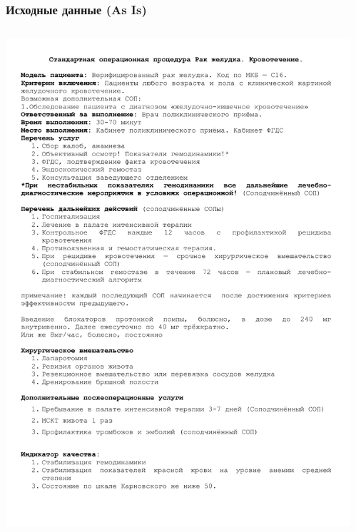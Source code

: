 \documentclass[10pt]{beamer}
\begin{document}
\begin{frame}
  \frametitle{Исходные данные (As Is)}
  \begin{columns}[t]
    \begin{column}{0.5\textwidth}
    \includegraphics[width=1\linewidth]{qms-pics/sop-ex-1.pdf}
    \end{column}
    \begin{column}{0.5\textwidth}

\end{column}
\end{columns}
\end{frame}
\end{document}
